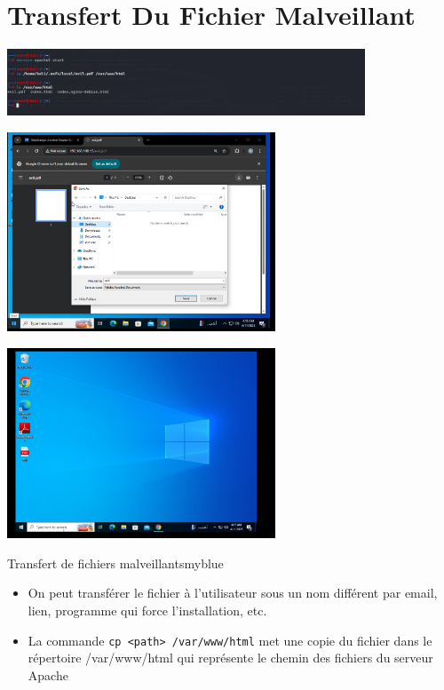 \section{Transfert Du Fichier Malveillant}

\begin{center}
    \includegraphics[width=0.8\textwidth]{Question/SC/9_10_11-.PNG}
\end{center}

\vspace{0.15cm}

\begin{center}
    \includegraphics[width=0.6\textwidth]{Question/SC/12_1-.PNG}
\end{center}

\vspace{0.15cm}

\begin{center}
    \includegraphics[width=0.6\textwidth]{Question/SC/12_2.PNG}
\end{center}


\vspace{0.35cm}

\begin{prettyBox}{Transfert de fichiers malveillants}{myblue}
\begin{itemize}
    \item On peut transférer le fichier à l'utilisateur sous un nom différent par email, lien, programme qui force l'installation, etc.
    \item La commande \texttt{cp <path> /var/www/html} met une copie du fichier dans le répertoire /var/www/html qui représente le chemin des fichiers du serveur Apache
\end{itemize}
\end{prettyBox}
